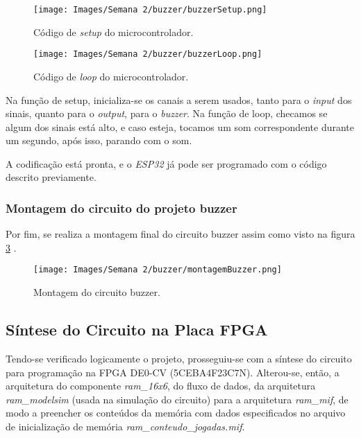 \documentclass[amsmath,amssymb,floatfix]{report}
\begin{document}
\begin{figure}[H]
    \centering
    \texttt{[image: Images/Semana 2/buzzer/buzzerSetup.png]}
    \caption{Código de \textit{setup} do microcontrolador.}
    \label{fig:buzzerSetup}
\end{figure}

\begin{figure}[H]
    \centering
    \texttt{[image: Images/Semana 2/buzzer/buzzerLoop.png]}
    \caption{Código de \textit{loop} do microcontrolador.}
    \label{fig:buzzerLoop}
\end{figure}

Na função de setup, inicializa-se os canais a serem usados, tanto para o \textit{input} dos sinais, quanto para o \textit{output}, para o \textit{buzzer}. Na função de loop, checamos se algum dos sinais está alto, e caso esteja, tocamos um som correspondente durante um segundo, após isso, parando com o som.

A codificação está pronta, e o \textit{ESP32} já pode ser programado com o código descrito previamente.

\subsubsection{Montagem do circuito do projeto buzzer}
Por fim, se realiza a montagem final do circuito buzzer assim como visto na figura \ref{fig:buzzerMontagem} .

\begin{figure}[H]
    \centering
    \texttt{[image: Images/Semana 2/buzzer/montagemBuzzer.png]}
    \caption{Montagem do circuito buzzer.}
    \label{fig:buzzerMontagem}
\end{figure}


\subsection{Síntese do Circuito na Placa FPGA}
\label{subsec:sintese2}

Tendo-se verificado logicamente o projeto, prosseguiu-se com a síntese do circuito para programação na FPGA DE0-CV (5CEBA4F23C7N). Alterou-se, então, a arquitetura do componente \textit{ram\_16x6}, do fluxo de dados, da arquitetura \textit{ram\_modelsim} (usada na simulação do circuito) para a arquitetura \textit{ram\_mif}, de modo a preencher os conteúdos da memória com dados especificados no arquivo de inicialização de memória \textit{ram\_conteudo\_jogadas.mif}.
\end{document}
